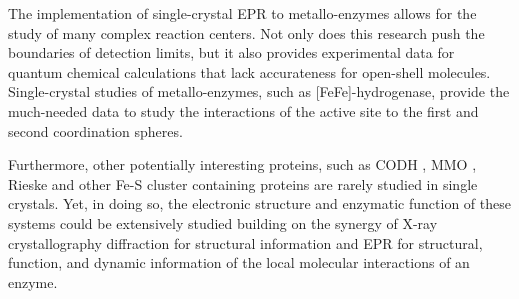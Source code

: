 The implementation of single-crystal EPR to metallo-enzymes allows for the study of many complex reaction centers. \cite{holm2014introduction} Not only does this research push the boundaries of detection limits, but it also provides experimental data for quantum chemical calculations that lack accurateness for open-shell molecules. Single-crystal studies of metallo-enzymes, such as [FeFe]-hydrogenase, provide the much-needed data to study the interactions of the active site to the first and second coordination spheres. 

Furthermore, other potentially interesting proteins, such as CODH \cite{C5CS00182J}, MMO \cite{Hoffman2014rev}, Rieske \cite{FERRARO2005175} and other Fe-S cluster containing proteins \cite{FeSClustersReview} are rarely studied in single crystals. Yet, in doing so, the electronic structure and enzymatic function of these systems could be extensively studied building on the synergy of X-ray crystallography diffraction for structural information and EPR for structural, function, and dynamic information of the local molecular interactions of an enzyme.  


{\renewcommand{\bibsection}{\clearpage\section*{\bibname}\markboth{\bibname}{\bibname}}
\renewcommand{\bibname}{REFERENCES}


}